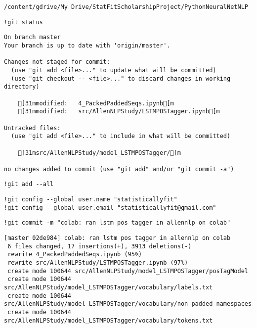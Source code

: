\documentclass[
]{article}
\begin{document}
\begin{verbatim}
/content/gdrive/My Drive/StatFitScholarshipProject/PythonNeuralNetNLP
\end{verbatim}

\begin{verbatim}
!git status
\end{verbatim}

\begin{verbatim}
On branch master
Your branch is up to date with 'origin/master'.

Changes not staged for commit:
  (use "git add <file>..." to update what will be committed)
  (use "git checkout -- <file>..." to discard changes in working directory)

    [31mmodified:   4_PackedPaddedSeqs.ipynb[m
    [31mmodified:   src/AllenNLPStudy/LSTMPOSTagger.ipynb[m

Untracked files:
  (use "git add <file>..." to include in what will be committed)

    [31msrc/AllenNLPStudy/model_LSTMPOSTagger/[m

no changes added to commit (use "git add" and/or "git commit -a")
\end{verbatim}

\begin{verbatim}
!git add --all
\end{verbatim}

\begin{verbatim}
!git config --global user.name "statisticallyfit"
!git config --global user.email "statisticallyfit@gmail.com"
\end{verbatim}

\begin{verbatim}
!git commit -m "colab: ran lstm pos tagger in allennlp on colab"
\end{verbatim}

\begin{verbatim}
[master 02de984] colab: ran lstm pos tagger in allennlp on colab
 6 files changed, 17 insertions(+), 3913 deletions(-)
 rewrite 4_PackedPaddedSeqs.ipynb (95%)
 rewrite src/AllenNLPStudy/LSTMPOSTagger.ipynb (97%)
 create mode 100644 src/AllenNLPStudy/model_LSTMPOSTagger/posTagModel
 create mode 100644 src/AllenNLPStudy/model_LSTMPOSTagger/vocabulary/labels.txt
 create mode 100644 src/AllenNLPStudy/model_LSTMPOSTagger/vocabulary/non_padded_namespaces.txt
 create mode 100644 src/AllenNLPStudy/model_LSTMPOSTagger/vocabulary/tokens.txt
\end{verbatim}
\end{document}
